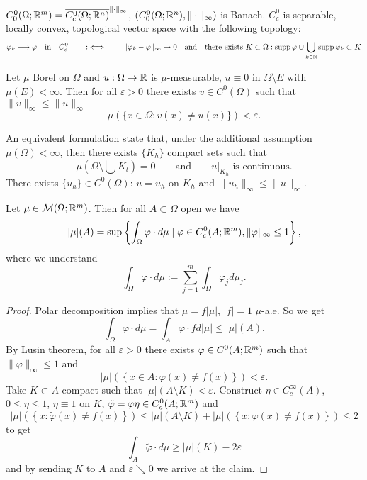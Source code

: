 \begin{remark}
$C^0_0(\Omega;\mathbb{R}^m) = \overline{C^0_c(\Omega;\mathbb{R}^n)}^{\|\cdot\|_\infty}$,
$(C^0_0(\Omega;\mathbb{R}^n),\|\cdot\|_\infty)$ is Banach.
$C^0_c$ is separable, locally convex, topological vector space with the
following topology:
\[
\varphi_k \longrightarrow \varphi \quad \text{in} \quad C^0_c 
\qquad :\iff \qquad
\|\varphi_k - \varphi\|_\infty \to 0
\quad \text{and} \quad
\text{there exists } K \subset \Omega:
\operatorname{supp} \varphi \cup \bigcup_{k\in\mathbb{N}} \operatorname{supp} \varphi_k \subset K
\]
\end{remark}

\begin{theorem}[Lusin]
Let $\mu$ Borel on $\Omega$ and $u : \Omega \to \mathbb{R}$ is $\mu$-measurable, $u
\equiv 0$ in $\Omega \setminus E$ with $\mu(E) < \infty$. Then for all
$\varepsilon > 0$ there exists $v \in C^0(\Omega)$ such that $\|v\|_\infty
\leq \|u\|_\infty$
\[
\mu(\{x \in \Omega: v(x) \neq u(x)\}) < \varepsilon.
\]
\end{theorem}

\begin{remark}
An equivalent formulation state that, under the additional assumption
$\mu(\Omega) < \infty$, then there exists $\{K_h\}$ compact sets such that
\[
\mu(\Omega \setminus \bigcup K_l) = 0
\qquad \text{and} \qquad
u\big|_{K_h} \text{ is continuous}.
\]
There exists $\{u_h\} \in C^0(\Omega)$: $u = u_h$ on $K_h$ and $\|u_h\|_\infty
\leq \|u\|_\infty$.
\end{remark}

\begin{proposition} \label{prop:characterization_tot_var}
Let $\mu \in \mathcal{M}(\Omega;\mathbb{R}^m)$. Then for all $A\subset \Omega$ open we have 
\begin{equation} \label{eq:tot_var_characterization}
|\mu|(A) = \sup\left\{ \int_\Omega \varphi \cdot d\mu \mid 
\varphi \in C^0_c(A;\mathbb{R}^m), \|\varphi\|_\infty \leq 1\right\},
\end{equation}
where we understand 
\[
\int_\Omega \varphi \cdot d\mu := \sum_{j=1}^m \int_\Omega \varphi_j d\mu_j.
\]
\end{proposition}

\begin{proof}
Polar decomposition implies that
$\mu = f|\mu|$, $|f| =1 $ $\mu$-a.e. So we get
\[
\int_\Omega \varphi \cdot d\mu = \int_A \varphi \cdot fd|\mu| \leq |\mu|(A).
\]
By Lusin theorem, for all $\varepsilon > 0$ there exists $\varphi \in
C^0(A;\mathbb{R}^m)$ such that $\|\varphi\|_\infty \leq 1$ and 
\[
|\mu|\left(\left\{x \in A : \varphi(x) \neq f(x)\right\}\right) < \varepsilon.
\]
Take $K \subset A$ compact such that $|\mu|(A\setminus K) < \varepsilon$.
Construct $\eta \in C^\infty_c(A)$, $0 \leq \eta \leq 1$, $\eta \equiv 1$ on
$K$, $\tilde \varphi = \varphi \eta \in C^0_c(A;\mathbb{R}^m)$ and 
\[
|\mu|\left(\left\{ x: \tilde \varphi(x) \neq f(x) \right\}\right)
\leq
|\mu|(A\setminus K)
+
|\mu|\left(\left\{ x: \varphi(x) \neq f(x) \right\}\right)
\leq 2
\]
to get 
\[
\int_A \tilde \varphi \cdot d\mu \geq |\mu|(K) - 2 \varepsilon 
\]
and by sending $K$ to $A$ and $\varepsilon \searrow 0$ we arrive at the claim.
\end{proof}


